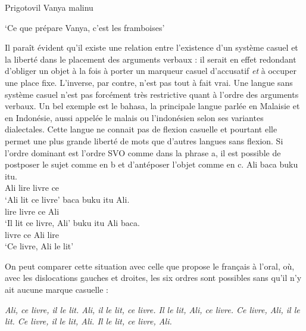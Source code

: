 {        {Prigotovil}   {Vanya}   {malinu}

    ‘Ce que prépare  Vanya,  c’est les framboises’
    \z

    Il paraît évident qu’il existe une relation entre l’existence d’un système casuel et la liberté dans le placement des arguments verbaux : il serait en effet redondant d’obliger un objet à la fois à porter un marqueur casuel d’accusatif \textit{et} à occuper une place fixe. L’inverse, par contre, n’est pas tout à fait vrai. Une langue sans système casuel n’est pas forcément très restrictive quant à l’ordre des arguments verbaux. Un bel exemple est le bahasa, la principale langue parlée en Malaisie et en Indonésie, aussi appelée le malais ou l’indonésien selon ses variantes dialectales. Cette langue ne connait pas de flexion casuelle et pourtant elle permet une plus grande liberté de mots que d’autres langues sans flexion. Si l’ordre dominant est l’ordre SVO comme dans la phrase a, il est possible de postposer le sujet comme en b et d’antéposer l’objet comme en c.
    \ea
    \ea
    \gll Ali baca buku itu.\\
    Ali lire    livre  ce\\
    \glt  ‘Ali lit ce livre’
    \ex
    \gll baca buku itu Ali.\\
    lire    livre  ce Ali\\
    \glt  ‘Il lit ce livre, Ali’
    \ex
    \gll buku itu Ali baca.\\
        livre ce Ali lire    \\
    \glt  ‘Ce livre, Ali le lit’
    \z
    \z

    On peut comparer cette situation avec celle que propose le français à l’oral, où, avec les dislocations gauches et droites, les six ordres sont possibles sans qu’il n’y ait aucune marque casuelle :

    \ea
    \ea\itshape {Ali, ce livre, il le lit.}
    \ex\itshape {Ali, il le lit, ce livre.}
    \ex\itshape {Il le lit, Ali, ce livre.}
    \ex\itshape {Ce livre, Ali, il le lit.}
    \ex\itshape {Ce livre, il le lit, Ali.}
    \ex\itshape {Il le lit, ce livre, Ali.}
    \z
    \z
}
